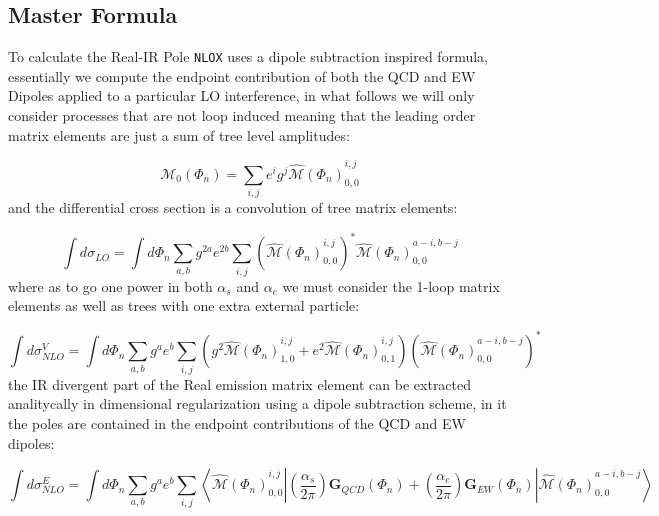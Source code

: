 \documentclass[a4paper]{article}
\def \NLOX{\texttt{NLOX} }
\begin{document}
\subsection{Master Formula}
To calculate the Real-IR Pole \NLOX uses a dipole subtraction inspired formula, essentially we 
compute the endpoint contribution of both the QCD and EW Dipoles applied to a particular LO 
interference, in what follows we will only consider processes that are not loop induced meaning 
that the leading order matrix elements are just a sum of tree level amplitudes:

\begin{equation}
 \mathcal{M}_{0}(\Phi_n) = \sum_{i,j}e^i g^j {\hat{\mathcal{M}}(\Phi_n)}^{i,j}_{0,0}
\end{equation}
and the differential cross section is a convolution of tree matrix elements:

\begin{equation}
 \int d\sigma_{LO} = \int d\Phi_{n}
 \sum_{a,b} g^{2a} e^{2b} 
 \sum_{i,j}\left({\hat{\mathcal{M}}(\Phi_n)}^{i,j}_{0,0}\right)^{*}{\hat{\mathcal{M}}(\Phi_n)}^{a-i,b-j}_{0,0}
\end{equation}
where as to go one power in both $\alpha_s$ and $\alpha_e$ we must consider the 1-loop
matrix elements as well as trees with one extra external particle:

\begin{equation}
 \int d\sigma^V_{NLO} = 
 \int d\Phi_{n}\sum_{a,b}
 g^a e^b 
 \sum_{i,j}\left(g^2{\hat{\mathcal{M}}(\Phi_n)}^{i,j}_{1,0}
 +e^2{\hat{\mathcal{M}}(\Phi_n)}^{i,j}_{0,1}\right)
 \left({\hat{\mathcal{M}}(\Phi_n)}^{a-i,b-j}_{0,0}\right)^{*}
\end{equation}
the IR divergent part of the Real emission matrix element can be extracted analitycally in 
dimensional regularization using a dipole subtraction scheme, in it the poles are contained 
in the endpoint contributions of the QCD and EW dipoles:

\begin{equation}
 \int d\sigma^E_{NLO} = \int d\Phi_{n}
 \sum_{a,b} g^{a} e^{b} 
 \sum_{i,j}
 \left<{\hat{\mathcal{M}}(\Phi_n)}^{i,j}_{0,0}\right|
 \left(\frac{\alpha_s}{2\pi}\right)\textbf{G}_{QCD}(\Phi_n)
 +
 \left(\frac{\alpha_e}{2\pi}\right)\textbf{G}_{EW}(\Phi_n)
 \left|{\hat{\mathcal{M}}(\Phi_n)}^{a-i,b-j}_{0,0}\right>
\end{equation}
\end{document}
